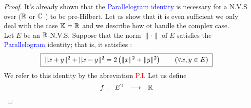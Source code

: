 \begin{proof}
  It's already shown that the 
  \textcolor{blue}{
  Parallelogram identity 
  } is necessary for a N.V.S over ($\mathbb{R} $ or $\mathbb{C}  $ ) to be pre-Hilbert.
  Let us show that it is even sufficient we only deal with the case 
  $\mathbb{K} = \mathbb{R}  $ and we describe how ot handle the complex case. \\
  Let $E $ be an $\mathbb{R}  $-N.V.S. Suppose that the norm $\| \cdot  \|  $ of 
  $E $ satisfies the 
  \textcolor{blue}{
  Parallelogram 
  } identity; that is, it satisfies : 
  \[
    \fbox{
      $\| x+y \| ^2  + \| x-y \| ^2  = 2 
      \left( 
        \| x \| ^2  + \| y \| ^2 
      \right) \quad \quad \left( \forall x,y \in  E \right)$
    }
  \]
  We refer to this identity by the abreviation \textcolor{red}{P.I}. Let us define 
  \[
  \begin{array}{cccc}
        f : & E^2    & \longrightarrow &  \mathbb{R} \\
  

\end{array}\]
\end{proof}

